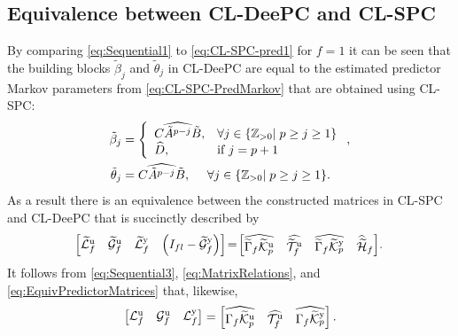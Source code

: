 \subsection{Equivalence between \ac{CL-DeePC} and \ac{CL-SPC}}
By comparing \eqref{eq:Sequential1} to \eqref{eq:CL-SPC-pred1} for $f=1$ it can be seen that the building blocks $\tilde{\beta}_j$ and $\tilde{\theta}_j$ in \ac{CL-DeePC} are equal to the estimated predictor Markov parameters from \eqref{eq:CL-SPC-PredMarkov} that are obtained using \ac{CL-SPC}:
\begin{subequations}\label{eq:EquivMarkov}
	\begin{align}
		\tilde{\beta}_j &= \left\{\begin{array}{ll}
			\widehat{C\tilde{A}^{p-j}\tilde{B}}, &\forall j\in\{\mathbb{Z}_{>0}|\;p \geq j \geq 1\}\\
			\widehat{D}, &\text{if } j=p+1
		\end{array}\right.,\label{eq:EquivMarkovInputs}\\
	\tilde{\theta}_j &= \widehat{C\tilde{A}^{p-j}\tilde{B}},\mkern24mu \forall j\in\{\mathbb{Z}_{>0}|\;p \geq j \geq 1\}\label{eq:EquivMarkovOutputs}.
	\end{align}
\end{subequations}
As a result there is an equivalence between the constructed matrices in \ac{CL-SPC} and \ac{CL-DeePC} that is succinctly described by
\begin{align}\label{eq:EquivPredictorMatrices}
	\mkern-3mu\begin{bmatrix}
		\widetilde{\mathcal{L}}^\mathrm{u}_f & \widetilde{\mathcal{G}}^\mathrm{u}_f & \widetilde{\mathcal{L}}^\mathrm{y}_f & \left(I_{fl}-\widetilde{\mathcal{G}}^\mathrm{y}_f\right)
	\end{bmatrix}\mkern-3mu=\mkern-3mu\begin{bmatrix}
		\widehat{\widetilde{\Gamma}_f\widetilde{\mathcal{K}}_{p}^{\mathrm{{u}}}} & \widehat{\widetilde{\mathcal{T}}_f^\mathrm{u}} & \widehat{\widetilde{\Gamma}_f\widetilde{\mathcal{K}}_{p}^{\mathrm{{y}}}} & \widehat{\widetilde{\mathcal{H}}}_f
	\end{bmatrix}\mkern-3mu.
\end{align}
It follows from \eqref{eq:Sequential3}, \eqref{eq:MatrixRelations}, and \eqref{eq:EquivPredictorMatrices} that, likewise,
\begin{align}\label{eq:EquivInnovationMatrices}
	\begin{bmatrix}
		\mathcal{L}^\mathrm{u}_f & \mathcal{G}^\mathrm{u}_f & \mathcal{L}^\mathrm{y}_f
	\end{bmatrix}=\begin{bmatrix}
		\widehat{\Gamma_f\widetilde{\mathcal{K}}_{p}^{\mathrm{{u}}}} & \widehat{\mathcal{T}_f^\mathrm{u}} & \widehat{\Gamma_f\widetilde{\mathcal{K}}_{p}^{\mathrm{{y}}}}
	\end{bmatrix}.
\end{align}

